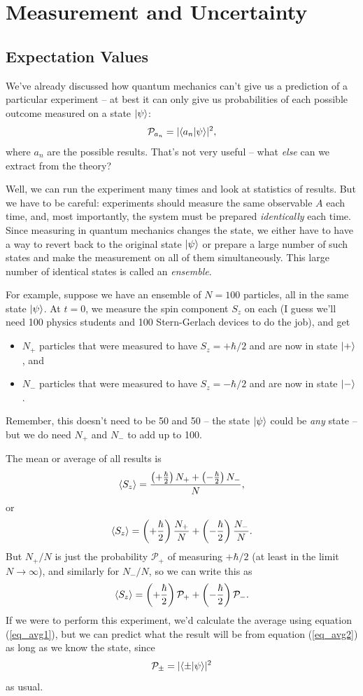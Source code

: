\chapter{Measurement and Uncertainty}

\section{Expectation Values}

We've already discussed how quantum mechanics can't give us a prediction of a particular experiment -- at best it can only give us probabilities of each possible outcome measured on a state $| \psi \rangle$:
\[
\mathcal{P}_{a_n} = | \langle a_n | \psi \rangle|^2,
\]
where $a_n$ are the possible results.  That's not very useful -- what \emph{else} can we extract from the theory?

Well, we can run the experiment many times and look at statistics of results.  But we have to be careful:  experiments should measure the same observable $A$ each time, and, most importantly, the system must be prepared \emph{identically} each time.  Since measuring in quantum mechanics changes the state, we either have to have a way to revert back to the original state $| \psi \rangle$ or prepare a large number of such states and make the measurement on all of them simultaneously.  This large number of identical states is called an \emph{ensemble}.

For example, suppose we have an ensemble of $N = 100$ particles, all in the same state $| \psi \rangle$.  At $t=0$, we measure the spin component $S_z$ on each (I guess we'll need 100 physics students and 100 Stern-Gerlach devices to do the job), and get
\begin{itemize}
\item $N_+$ particles that were measured to have $S_z = +\hbar/2$ and are now in state $| + \rangle$, and
\item $N_-$ particles that were measured to have $S_z = -\hbar/2$ and are now in state $| - \rangle$.
\end{itemize}
Remember, this doesn't need to be 50 and 50 -- the state $| \psi \rangle$ could be \emph{any} state -- but we do need $N_+$ and $N_-$ to add up to 100.

The mean or average of all results is
\begin{equation}
\label{eq_avg1}
\langle S_z \rangle = \frac{\left( +\frac{\hbar}{2} \right) N_+ + \left( -\frac{\hbar}{2} \right) N_-}{N},
\end{equation}
or
\[
\langle S_z \rangle = \left( +\frac{\hbar}{2} \right) \frac{N_+}{N} + \left( -\frac{\hbar}{2} \right) \frac{N_-}{N}.
\]
But $N_+/N$ is just the probability $\mathcal{P_+}$ of measuring $+\hbar/2$ (at least in the limit $N \to \infty$), and similarly for $N_-/N$, so we can write this as
\begin{equation}
\label{eq_avg2}
\langle S_z \rangle = \left( +\frac{\hbar}{2} \right) \mathcal{P}_+ + \left( -\frac{\hbar}{2} \right) \mathcal{P}_-.
\end{equation}
If we were to perform this experiment, we'd calculate the average using equation (\ref{eq_avg1}), but we can predict what the result will be from equation (\ref{eq_avg2}) as long as we know the state, since
\[
\mathcal{P}_\pm = |\langle \pm | \psi \rangle|^2
\]
as usual.

